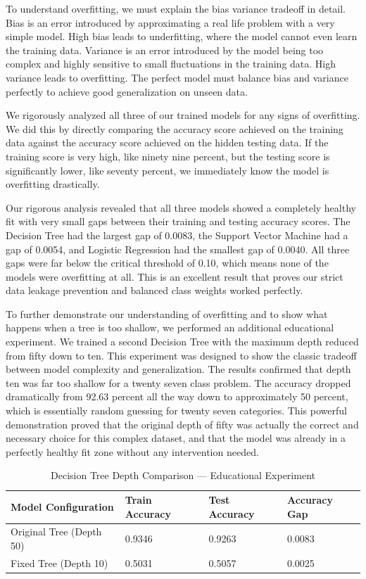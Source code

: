 \documentclass[12pt]{article}
\begin{document}
To understand overfitting, we must explain the bias variance tradeoff in detail. Bias is an error introduced by approximating a real life problem with a very simple model. High bias leads to underfitting, where the model cannot even learn the training data. Variance is an error introduced by the model being too complex and highly sensitive to small fluctuations in the training data. High variance leads to overfitting. The perfect model must balance bias and variance perfectly to achieve good generalization on unseen data. 

We rigorously analyzed all three of our trained models for any signs of overfitting. We did this by directly comparing the accuracy score achieved on the training data against the accuracy score achieved on the hidden testing data. If the training score is very high, like ninety nine percent, but the testing score is significantly lower, like seventy percent, we immediately know the model is overfitting drastically. 

Our rigorous analysis revealed that all three models showed a completely healthy fit with very small gaps between their training and testing accuracy scores. The Decision Tree had the largest gap of 0.0083, the Support Vector Machine had a gap of 0.0054, and Logistic Regression had the smallest gap of 0.0040. All three gaps were far below the critical threshold of 0.10, which means none of the models were overfitting at all. This is an excellent result that proves our strict data leakage prevention and balanced class weights worked perfectly.

To further demonstrate our understanding of overfitting and to show what happens when a tree is too shallow, we performed an additional educational experiment. We trained a second Decision Tree with the maximum depth reduced from fifty down to ten. This experiment was designed to show the classic tradeoff between model complexity and generalization. The results confirmed that depth ten was far too shallow for a twenty seven class problem. The accuracy dropped dramatically from 92.63 percent all the way down to approximately 50 percent, which is essentially random guessing for twenty seven categories. This powerful demonstration proved that the original depth of fifty was actually the correct and necessary choice for this complex dataset, and that the model was already in a perfectly healthy fit zone without any intervention needed.

\begin{table}[H]
\centering
\caption{Decision Tree Depth Comparison — Educational Experiment}
\begin{tabular}{|l|l|l|l|}
\hline
\textbf{Model Configuration} & \textbf{Train Accuracy} & \textbf{Test Accuracy} & \textbf{Accuracy Gap} \\ \hline
Original Tree (Depth 50) & 0.9346 & 0.9263 & 0.0083 \\ \hline
Fixed Tree (Depth 10) & 0.5031 & 0.5057 & 0.0025 \\ \hline
\end{tabular}
\end{table}
\end{document}
